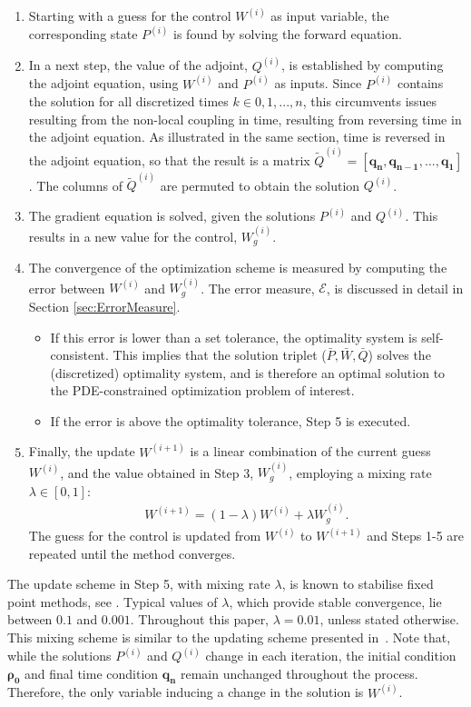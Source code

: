 \documentclass[11pt, a4paper]{article}
\theoremstyle{definition}
\newcommand{\adj}{q}
\begin{document}
\begin{enumerate}
	\item Starting with a guess for the control $W^{(i)}$ as input variable, the corresponding state $P^{(i)}$ is found by solving the forward equation.
	\item In a next step, the value of the adjoint, $Q^{(i)}$, is established by computing the adjoint equation, using $W^{(i)}$ and $P^{(i)}$ as inputs. Since $P^{(i)}$ contains the solution for all discretized times $k \in 0,1,...,n$, this circumvents issues resulting from the non-local coupling in time, resulting from reversing time in the adjoint equation. As illustrated in the same section, time is reversed in the adjoint equation, so that the result is a matrix $\tilde{Q}^{(i)} =  [\boldsymbol{\adj_n},\boldsymbol{\adj_{n-1}}, ..., \boldsymbol{\adj_1} ]$. The columns of $\tilde{Q}^{(i)}$ are permuted to obtain the solution  $Q^{(i)}$.
	\item The gradient equation is solved, given the solutions $P^{(i)}$ and $Q^{(i)}$. This results in a new value for the control, $W^{(i)}_g$.
	\item  The convergence of the optimization scheme is measured by computing the error between $W^{(i)}$ and $W^{(i)}_{g}$. The error measure, $\mathcal{E}$, is discussed in detail in Section \ref{sec:ErrorMeasure}. 
	\begin{itemize}
		\item  If this error is lower than a set tolerance, the optimality system is self-consistent. This implies that the solution triplet ($\bar{P},\bar{W},\bar{Q}$) solves the (discretized) optimality system, and is therefore an optimal solution to the PDE-constrained optimization problem of interest.
		\item If the error is above the optimality tolerance, Step 5 is executed.
	\end{itemize}
	\item Finally, the update $W^{(i+1)}$ is a linear combination of the current guess $W^{(i)}$, and the value obtained in Step 3, $W^{(i)}_{g}$, employing a mixing rate $\lambda \in [0,1]$:
	\begin{align*}
	W^{(i+1)} = (1-\lambda)W^{(i)} + \lambda W^{(i)}_{g}.
	\end{align*}
	The guess for the control is updated from $W^{(i)} $ to $W^{(i+1)} $ and Steps 1-5 are repeated until the method converges. 
\end{enumerate}
\vspace{0.3cm}
The update scheme in Step 5, with mixing rate $\lambda$, is known to stabilise fixed point methods, see \cite{Roth1}. Typical values of $\lambda$, which provide stable convergence, lie between $0.1$ and $0.001$. Throughout this paper, $\lambda =0.01$, unless stated otherwise. This mixing scheme is similar to the updating scheme presented in~\cite{Burger1}. 
Note that, while the solutions $P^{(i)}$ and $Q^{(i)}$ change in each iteration, the initial condition $\boldsymbol{\rho_0}$ and final time condition $\boldsymbol{\adj_n}$ remain unchanged throughout the process. Therefore, the only variable inducing a change in the solution is $W^{(i)}$.
\end{document}
